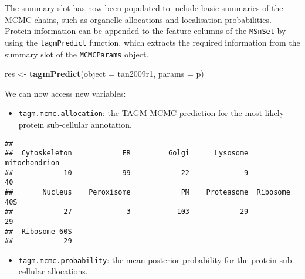 \documentclass[9pt,a4paper,]{extarticle}
\newenvironment{Shaded}{\begin{snugshade}}{\end{snugshade}}
\newcommand{\DataTypeTok}[1]{\textcolor[rgb]{0.13,0.29,0.53}{#1}}
\newcommand{\KeywordTok}[1]{\textcolor[rgb]{0.13,0.29,0.53}{\textbf{#1}}}
\newcommand{\NormalTok}[1]{#1}
\newcommand{\OperatorTok}[1]{\textcolor[rgb]{0.81,0.36,0.00}{\textbf{#1}}}
\newcommand{\StringTok}[1]{\textcolor[rgb]{0.31,0.60,0.02}{#1}}
\begin{document}
The summary slot has now been populated to include basic summaries of
the MCMC chains, such as organelle allocations and localisation
probabilities. Protein information can be appended to the feature
columns of the \texttt{MSnSet} by using the \texttt{tagmPredict} function, which
extracts the required information from the summary slot of the
\texttt{MCMCParams} object.

\begin{Shaded}
\begin{Highlighting}[]
\NormalTok{res <-}\StringTok{ }\KeywordTok{tagmPredict}\NormalTok{(}\DataTypeTok{object =}\NormalTok{ tan2009r1, }\DataTypeTok{params =}\NormalTok{ p)}
\end{Highlighting}
\end{Shaded}

We can now access new variables:

\begin{itemize}
\item
  \texttt{tagm.mcmc.allocation}: the TAGM MCMC prediction for the most likely
  protein sub-cellular annotation.
\end{itemize}

\begin{Shaded}
\end{Shaded}

\begin{verbatim}
## 
##  Cytoskeleton            ER         Golgi      Lysosome mitochondrion 
##            10            99            22             9            40 
##       Nucleus    Peroxisome            PM    Proteasome  Ribosome 40S 
##            27             3           103            29            29 
##  Ribosome 60S 
##            29
\end{verbatim}

\begin{itemize}
\item
  \texttt{tagm.mcmc.probability}: the mean posterior probability for the protein
  sub-cellular allocations.
\end{itemize}

\begin{Shaded}
\end{Shaded}
\end{document}
